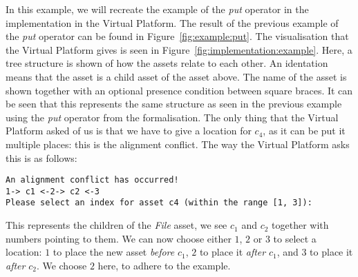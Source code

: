 \begin{example}
  In this example, we will recreate the example of the \emph{put} operator in
  the implementation in the Virtual Platform. The result of the previous
  example of the \emph{put} operator can be found in Figure~\ref{fig:example:put}.
  The visualisation that the Virtual Platform gives is seen in Figure~\ref{fig:implementation:example}.
  Here, a tree structure is shown of how the assets relate to each other. An identation
  means that the asset is a child asset of the asset above. The name of the asset is shown
  together with an optional presence condition between square braces. 
  It can be seen that this represents the same structure as seen in the previous example
  using the \emph{put} operator from the formalisation.
  The only thing that the Virtual Platform asked of us is that we have to give a 
  location for $c_4$, as it can be put it multiple places: this is the alignment conflict.
  The way the Virtual Platform asks this is as follows:
  \begin{verbatim}
An alignment conflict has occurred!
1-> c1 <-2-> c2 <-3
Please select an index for asset c4 (within the range [1, 3]):
  \end{verbatim}
  This represents the children of the \emph{File} asset, we see $c_1$ and $c_2$ together
  with numbers pointing to them. We can now choose either $1$, $2$ or $3$ to select a
  location: $1$ to place the new asset \emph{before} $c_1$, $2$ to place it \emph{after}
  $c_1$, and $3$ to place it \emph{after} $c_2$. We choose $2$ here, to adhere to the example.
\end{example}
